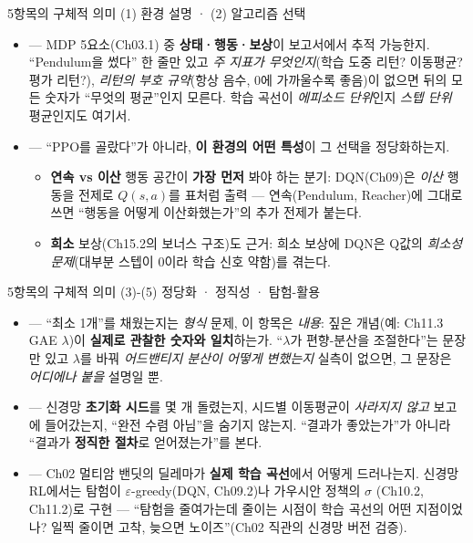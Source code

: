 \documentclass[aspectratio=169,11pt]{beamer}
\begin{document}
\begin{frame}{5항목의 구체적 의미 (1) 환경 설명 · (2) 알고리즘 선택}
  \small
  \begin{itemize}
    \item {} — MDP 5요소(Ch03.1) 중 \textbf{상태·행동·보상}이
      보고서에서 추적 가능한지. ``Pendulum을 썼다'' 한 줄만 있고 \emph{주
      지표가 무엇인지}(학습 도중 리턴? 이동평균? 평가 리턴?), \emph{리턴의
      부호 규약}(항상 음수, 0에 가까울수록 좋음)이 없으면 뒤의 모든
      숫자가 ``무엇의 평균''인지 모른다. 학습 곡선이 \emph{에피소드
      단위}인지 \emph{스텝 단위} 평균인지도 여기서.
    \item {} — ``PPO를 골랐다''가 아니라,
      \textbf{이 환경의 어떤 특성}이 그 선택을 정당화하는지.
      \begin{itemize}
        \item \textbf{연속 vs 이산} 행동 공간이 \textbf{가장 먼저} 봐야
          하는 분기: DQN(Ch09)은 \emph{이산} 행동을 전제로 $Q(s,a)$를
          표처럼 출력 — 연속(Pendulum, Reacher)에 그대로 쓰면 ``행동을
          어떻게 이산화했는가''의 추가 전제가 붙는다.
        \item \textbf{희소} 보상(Ch15.2의 보너스 구조)도 근거: 희소 보상에
          DQN은 Q값의 \emph{희소성 문제}(대부분 스텝이 0이라 학습 신호
          약함)를 겪는다.
      \end{itemize}
  \end{itemize}
\end{frame}

\begin{frame}{5항목의 구체적 의미 (3)-(5) 정당화 · 정직성 · 탐험-활용}
  \small
  \begin{itemize}
    \item {} — ``최소 1개''를 채웠는지는 \emph{형식}
      문제, 이 항목은 \emph{내용}: 짚은 개념(예: Ch11.3 GAE $\lambda$)이
      \textbf{실제로 관찰한 숫자와 일치}하는가. ``$\lambda$가 편향-분산을
      조절한다''는 문장만 있고 $\lambda$를 바꿔 \emph{어드밴티지 분산이
      어떻게 변했는지} 실측이 없으면, 그 문장은 \emph{어디에나 붙을}
      설명일 뿐.
    \item {} — 신경망 \textbf{초기화 시드}를 몇 개
      돌렸는지, 시드별 이동평균이 \emph{사라지지 않고} 보고에 들어갔는지,
      ``완전 수렴 아님''을 숨기지 않는지. ``결과가 좋았는가''가 아니라
      ``결과가 \textbf{정직한 절차}로 얻어졌는가''를 본다.
    \item {} — Ch02 멀티암 밴딧의 딜레마가
      \textbf{실제 학습 곡선}에서 어떻게 드러나는지. 신경망 RL에서는
      탐험이 $\varepsilon$-greedy(DQN, Ch09.2)나 가우시안 정책의 $\sigma$
      (Ch10.2, Ch11.2)로 구현 — ``탐험을 줄여가는데 줄이는 시점이 학습
      곡선의 어떤 지점이었나? 일찍 줄이면 고착, 늦으면 노이즈''(Ch02
      직관의 신경망 버전 검증).
  \end{itemize}
\end{frame}
\end{document}

